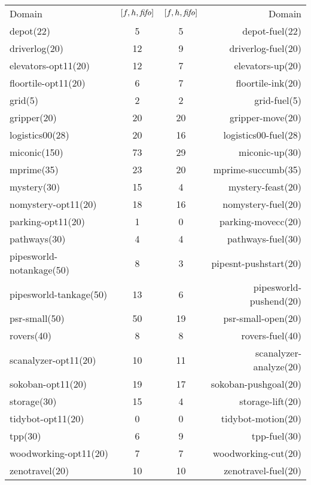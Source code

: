 \begin{center}
\begin{tabular}{|lc|cr|}
Domain & \([f,h,{\text{\textit{fifo}}}]\) & \([f,h,{\text{\textit{fifo}}}]\) & Domain\\
depot(22) & 5 & 5 & depot-fuel(22)\\
driverlog(20) & 12 & 9 & driverlog-fuel(20)\\
elevators-opt11(20) & 12 & 7 & elevators-up(20)\\
floortile-opt11(20) & 6 & 7 & floortile-ink(20)\\
grid(5) & 2 & 2 & grid-fuel(5)\\
gripper(20) & 20 & 20 & gripper-move(20)\\
logistics00(28) & 20 & 16 & logistics00-fuel(28)\\
miconic(150) & 73 & 29 & miconic-up(30)\\
mprime(35) & 23 & 20 & mprime-succumb(35)\\
mystery(30) & 15 & 4 & mystery-feast(20)\\
nomystery-opt11(20) & 18 & 16 & nomystery-fuel(20)\\
parking-opt11(20) & 1 & 0 & parking-movecc(20)\\
pathways(30) & 4 & 4 & pathways-fuel(30)\\
pipesworld-notankage(50) & 8 & 3 & pipesnt-pushstart(20)\\
pipesworld-tankage(50) & 13 & 6 & pipesworld-pushend(20)\\
psr-small(50) & 50 & 19 & psr-small-open(20)\\
rovers(40) & 8 & 8 & rovers-fuel(40)\\
scanalyzer-opt11(20) & 10 & 11 & scanalyzer-analyze(20)\\
sokoban-opt11(20) & 19 & 17 & sokoban-pushgoal(20)\\
storage(30) & 15 & 4 & storage-lift(20)\\
tidybot-opt11(20) & 0 & 0 & tidybot-motion(20)\\
tpp(30) & 6 & 9 & tpp-fuel(30)\\
woodworking-opt11(20) & 7 & 7 & woodworking-cut(20)\\
zenotravel(20) & 10 & 10 & zenotravel-fuel(20)\\
\end{tabular}
\end{center}
